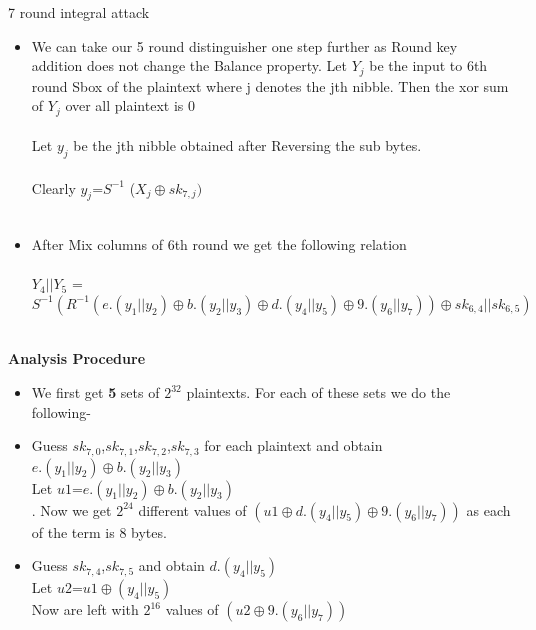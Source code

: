 \begin{frame}{ 7 round integral attack}
	
	\begin{itemize}
	\item We can take our 5 round distinguisher one step further as Round key addition does not change the Balance property. Let $Y_{j}$ be the input to 6th round Sbox of the  plaintext where j denotes the jth nibble. Then the xor sum of $Y_{j}$ over all plaintext is 0 \\
	
	\\
	Let $y_{j}$ be the jth nibble obtained after Reversing the sub bytes.\\ \\ Clearly $y_{j}$=$S^{-1}$ ($X_{j}\oplus sk_{7,j}) $ 
	\\ \\
	\item After Mix columns of 6th round we get the following relation \\ \\
	$Y_{4}||Y_{5}$ = $S^{-1}(R^{-1}(e.(y_{1}||y_{2})\oplus b.(y_{2}||y_{3})\oplus d.(y_{4}||y_{5})\oplus9.(y_{6}|| y_{7}))
	\oplus sk_{6,4} || sk_{6,5})$
	\\ \\
	\end{itemize}
\end{frame}
\begin{frame}
	\textbf{Analysis Procedure}
	\begin{itemize}
		\item We first get \textbf{5} sets of $2^{32}$ plaintexts. For each of these sets we do the following-
		\item Guess $sk_{7,0}$,$sk_{7,1}$,$sk_{7,2}$,$sk_{7,3}$ for each plaintext and obtain $e.(y_{1}||y_{2})\oplus b.(y_{2}||y_{3})$\\
		Let $u1$=$e.(y_{1}||y_{2})\oplus b.(y_{2}||y_{3})$ \\.
		Now we get $2^{24}$ different values of $(u1\oplus d.(y_{4}||y_{5})\oplus9.(y_{6}|| y_{7}))$ as each of the term is 8 bytes.
		
		\item Guess $sk_{7,4}$,$sk_{7,5}$ and obtain 
		$d.(y_{4}||y_{5})$\\
		Let $u2$=$u1 \oplus (y_{4}||y_{5})$  \\  
		Now are left with $2^{16}$ values of $(u2\oplus9.(y_{6}|| y_{7}))$ \\
	\end{itemize}
\end{frame}
